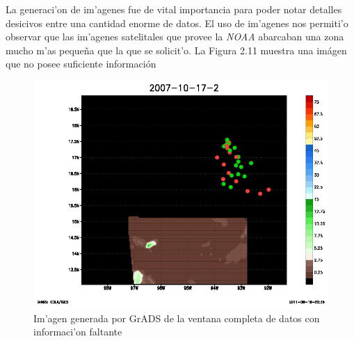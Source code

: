 La generaci'on de im'agenes fue de vital importancia para poder notar detalles desicivos entre una cantidad enorme de datos.
El uso de im'agenes nos permiti'o observar que las im'agenes satelitales que provee la \textit{NOAA} abarcaban una zona mucho
m'as peque\~na que la que se solicit'o. La Figura 2.11 muestra una im\'agen que no posee suficiente informaci\'on

\begin{figure}[h!]
 \centering
 \includegraphics[width=130mm]{./imagenes/2007_10_17_2.jpg}
 \caption{Im'agen generada por GrADS de la ventana completa de datos con informaci'on faltante}
\end{figure}
